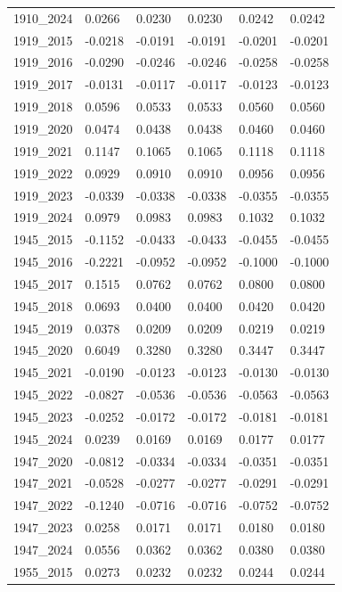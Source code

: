 \begin{table}[htbp]
\begin{tabular}{llllll}
1910_2024 & 0.0266 & 0.0230 & 0.0230 & 0.0242 & 0.0242 \\
1919_2015 & -0.0218 & -0.0191 & -0.0191 & -0.0201 & -0.0201 \\
1919_2016 & -0.0290 & -0.0246 & -0.0246 & -0.0258 & -0.0258 \\
1919_2017 & -0.0131 & -0.0117 & -0.0117 & -0.0123 & -0.0123 \\
1919_2018 & 0.0596 & 0.0533 & 0.0533 & 0.0560 & 0.0560 \\
1919_2020 & 0.0474 & 0.0438 & 0.0438 & 0.0460 & 0.0460 \\
1919_2021 & 0.1147 & 0.1065 & 0.1065 & 0.1118 & 0.1118 \\
1919_2022 & 0.0929 & 0.0910 & 0.0910 & 0.0956 & 0.0956 \\
1919_2023 & -0.0339 & -0.0338 & -0.0338 & -0.0355 & -0.0355 \\
1919_2024 & 0.0979 & 0.0983 & 0.0983 & 0.1032 & 0.1032 \\
1945_2015 & -0.1152 & -0.0433 & -0.0433 & -0.0455 & -0.0455 \\
1945_2016 & -0.2221 & -0.0952 & -0.0952 & -0.1000 & -0.1000 \\
1945_2017 & 0.1515 & 0.0762 & 0.0762 & 0.0800 & 0.0800 \\
1945_2018 & 0.0693 & 0.0400 & 0.0400 & 0.0420 & 0.0420 \\
1945_2019 & 0.0378 & 0.0209 & 0.0209 & 0.0219 & 0.0219 \\
1945_2020 & 0.6049 & 0.3280 & 0.3280 & 0.3447 & 0.3447 \\
1945_2021 & -0.0190 & -0.0123 & -0.0123 & -0.0130 & -0.0130 \\
1945_2022 & -0.0827 & -0.0536 & -0.0536 & -0.0563 & -0.0563 \\
1945_2023 & -0.0252 & -0.0172 & -0.0172 & -0.0181 & -0.0181 \\
1945_2024 & 0.0239 & 0.0169 & 0.0169 & 0.0177 & 0.0177 \\
1947_2020 & -0.0812 & -0.0334 & -0.0334 & -0.0351 & -0.0351 \\
1947_2021 & -0.0528 & -0.0277 & -0.0277 & -0.0291 & -0.0291 \\
1947_2022 & -0.1240 & -0.0716 & -0.0716 & -0.0752 & -0.0752 \\
1947_2023 & 0.0258 & 0.0171 & 0.0171 & 0.0180 & 0.0180 \\
1947_2024 & 0.0556 & 0.0362 & 0.0362 & 0.0380 & 0.0380 \\
1955_2015 & 0.0273 & 0.0232 & 0.0232 & 0.0244 & 0.0244 \\

\end{tabular}
\end{table}
